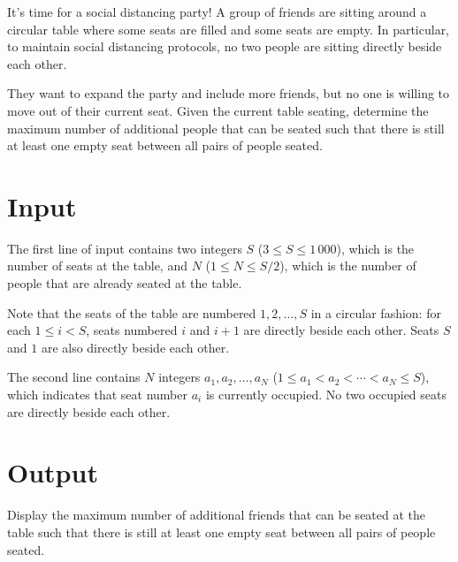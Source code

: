 
It's time for a social distancing party! A group of friends are sitting around
a circular table where some seats are filled and some seats are empty. In
particular, to maintain social distancing protocols, no two people are sitting
directly beside each other.

They want to expand the party and include more friends, but no one is willing to
move out of their current seat. Given the current table seating, determine the
maximum number of additional people that can be seated such that there is still
at least one empty seat between all pairs of people seated.


\section*{Input}
The first line of input contains two integers $S$ ($3 \leq S \leq 1\,000$),
which is the number of seats at the table, and $N$ ($1 \leq N \leq S/2$),
which is the number of people that are already seated at the table.

Note that the seats of the table are numbered $1, 2, \ldots, S$ in a circular
fashion: for each $1 \leq i < S$, seats numbered $i$ and $i+1$ are directly
beside each other. Seats $S$ and $1$ are also directly beside each other.

The second line contains $N$ integers $a_1, a_2, \ldots, a_N$
($1 \leq a_1 < a_2 < \cdots < a_N \leq S$), which indicates that seat number $a_{i}$
is currently occupied. No two occupied seats are directly beside each other.

\section*{Output}
Display the maximum number of additional friends that can be seated at the table
such that there is still at least one empty seat between all pairs of people
seated.
